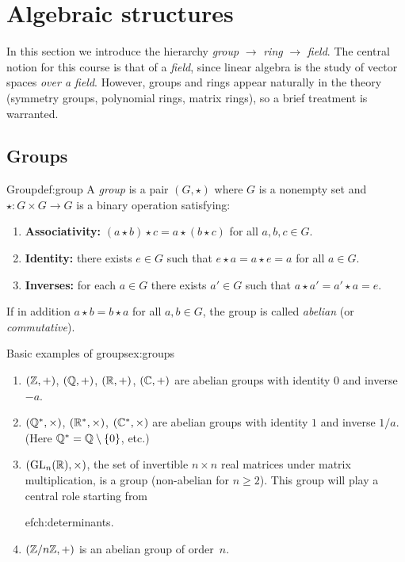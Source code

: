 \section{Algebraic structures}\label{sec:algebraic-structures}

In this section we introduce the hierarchy \emph{group} $\to$
\emph{ring} $\to$ \emph{field}. The central notion for this course is
that of a \emph{field}, since linear algebra is the study of vector
spaces \emph{over a field}. However, groups and rings appear naturally
in the theory (symmetry groups, polynomial rings, matrix rings), so a
brief treatment is warranted.

\subsection{Groups}\label{subsec:groups}

\begin{definition}{Group}{def:group}
A \emph{group} is a pair $(G,\star)$ where $G$ is a nonempty
set and $\star\colon G\times G\to G$ is a binary operation satisfying:
\begin{enumerate}[label=\textbf{G\arabic*.}]
  \item \textbf{Associativity:} $(a\star b)\star c = a\star(b\star c)$
    for all $a,b,c\in G$.
  \item \textbf{Identity:} there exists $e\in G$ such that
    $e\star a = a\star e = a$ for all $a\in G$.
  \item \textbf{Inverses:} for each $a\in G$ there exists $a'\in G$ such
    that $a\star a' = a'\star a = e$.
\end{enumerate}
If in addition $a\star b = b\star a$ for all $a,b\in G$, the group is
called \emph{abelian} (or \emph{commutative}).
\end{definition}

\begin{example}{Basic examples of groups}{ex:groups}
\begin{enumerate}[label=(\alph*)]
  \item $({\mathbb{Z}},+)$, $({\mathbb{Q}},+)$, $({\mathbb{R}},+)$, $({\mathbb{C}},+)$ are abelian groups with
    identity $0$ and inverse $-a$.
  \item $({\mathbb{Q}}^*,\times)$, $({\mathbb{R}}^*,\times)$, $({\mathbb{C}}^*,\times)$ are abelian
    groups with identity $1$ and inverse $1/a$. (Here
    ${\mathbb{Q}}^*={\mathbb{Q}}\setminus\left\{0\right\}$, etc.)
  \item $(\operatorname{GL}_n({\mathbb{R}}),\times)$, the set of invertible $n\times n$ real
    matrices under matrix multiplication, is a group (non-abelian for
    $n\geq 2$). This group will play a central role starting from
    
ef{ch:determinants}.
  \item $({\mathbb{Z}}/n{\mathbb{Z}},+)$ is an abelian group of order~$n$.
\end{enumerate}
\end{example}

